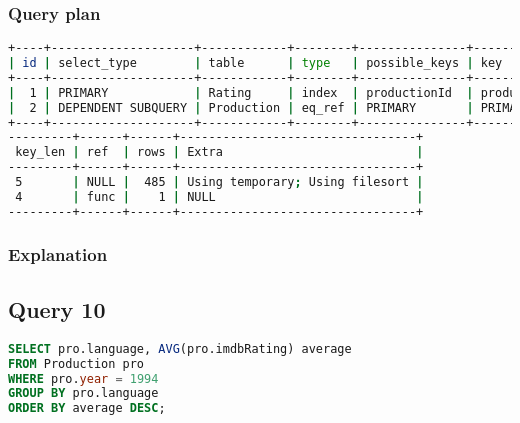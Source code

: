 \subsubsection{Query plan}
\begin{lstlisting}[language=bash]
+----+--------------------+------------+--------+---------------+--------------+
| id | select_type        | table      | type   | possible_keys | key          |
+----+--------------------+------------+--------+---------------+--------------+
|  1 | PRIMARY            | Rating     | index  | productionId  | productionId |
|  2 | DEPENDENT SUBQUERY | Production | eq_ref | PRIMARY       | PRIMARY      |
+----+--------------------+------------+--------+---------------+--------------+
---------+------+------+---------------------------------+
 key_len | ref  | rows | Extra                           |
---------+------+------+---------------------------------+
 5       | NULL |  485 | Using temporary; Using filesort |
 4       | func |    1 | NULL                            |
---------+------+------+---------------------------------+
\end{lstlisting}

\subsubsection{Explanation}


\subsection{Query 10}
\begin{lstlisting}[language=sql]
SELECT pro.language, AVG(pro.imdbRating) average
FROM Production pro
WHERE pro.year = 1994
GROUP BY pro.language
ORDER BY average DESC;
\end{lstlisting}

